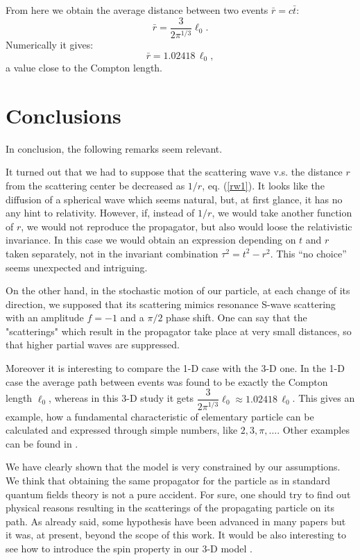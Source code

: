 \documentclass[a4paper,12pt]{article}
\begin{document}
    From here we obtain the average distance between two events
$\bar{r}=c\bar{t}$:
\begin{equation}\label{eq11}
\bar{r}=\frac{3}{2\pi^{1/3}} \ell_0.
\end{equation}
Numerically it gives:
$$
\bar{r}=1.02418 \,\ell_0,
$$
a value close to the Compton length.

\section{Conclusions}
In conclusion, the following remarks seem relevant.

     It turned out that we had to suppose that the scattering
     wave v.s. the distance $r$ from the scattering center be decreased
as $1/r$, eq. (\ref{rw1}).
     It looks like the diffusion of a spherical wave which seems  natural,
but, at first glance, it has no any hint to relativity.
However, if, instead of $1/r$, we would take another function of $r$, we
would not reproduce the propagator, but also would loose the relativistic
invariance. In this case we would obtain an expression depending on $t$ and
$r$ taken separately, not in the invariant combination $\tau^2=t^2-r^2$.
This ``no choice'' seems unexpected and intriguing.

      On the other hand, in the stochastic motion of our particle, at each
change of its direction, we supposed that its scattering mimics
resonance S-wave scattering with an amplitude $f=-1$ and a $ \pi/2
$ phase shift. One can say that the "scatterings" which result in
the propagator take place at very small distances, so that higher
partial waves are suppressed.


     Moreover it is interesting to compare the 1-D case with the 3-D one.
     In the 1-D case the average path
between events was found to be exactly the Compton length
$\ell_0$, whereas in this 3-D study it gets
$\dfrac{3}{2\pi^{1/3}}\ell_0 \approx 1.02418 \,\ell_0$. This gives
an example, how a  fundamental characteristic of elementary
particle can be calculated and expressed through simple  numbers,
like $2,3,\pi, \ldots$. Other examples can be found in
\cite{P.Noyes}.

    We have clearly shown that the model is very constrained by our
assumptions. We
think that obtaining the same propagator for the particle as in
standard  quantum
fields theory is not a pure accident. For sure, one should try to find
out physical reasons resulting in the scatterings of the propagating particle
on its path. As already said, some  hypothesis have been advanced in many
papers but it was, at present, beyond the scope of this work.  It would be also
interesting to see how to introduce the spin property in our 3-D model .
\bigskip
\end{document}
